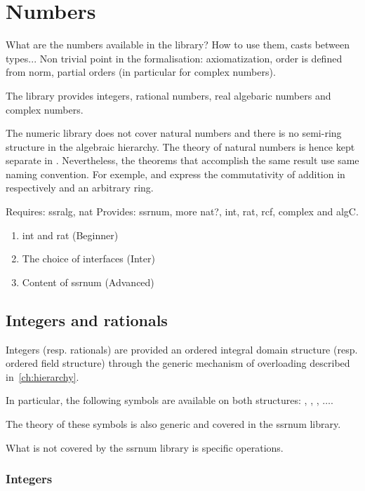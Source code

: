 \chapter{Numbers}

What are the numbers available in the library? How to use them, casts
between types... Non trivial point in the formalisation:
axiomatization, order is defined from norm, partial orders (in
particular for complex numbers).


The library provides integers, rational numbers, real algebaric
numbers and complex numbers.

The numeric library does not cover natural numbers and there is no
semi-ring structure in the algebraic hierarchy. The theory of natural
numbers is hence kept separate in . Nevertheless, the
theorems that accomplish the same result use same naming
convention. For exemple,  and  express the
commutativity of addition in respectively  and an arbitrary
ring.

Requires: ssralg, nat
Provides: ssrnum, more nat?, int, rat, rcf, complex and algC.

\begin{enumerate}
\item int and rat (Beginner)
\item The choice of interfaces (Inter)
\item Content of ssrnum (Advanced)
\end{enumerate}

\section{Integers and rationals}
\label{sec:integers-rationals}

Integers (resp. rationals) are provided an ordered integral domain
structure (resp. ordered field structure) through the
generic mechanism of overloading described in~\ref{ch:hierarchy}.

In particular, the following symbols are available on both structures:
, , \C{+}, $\ldots$.

The theory of these symbols is also generic and covered in the ssrnum
library.

What is not covered by the ssrnum library is specific operations.

\subsection{Integers}
\label{sec:integers}

